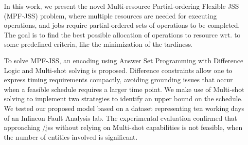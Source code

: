 \documentclass[submission,copyright,creativecommons]{eptcs}
\begin{document}
In this work, we present the novel Multi-resource Partial-ordering Flexible JSS (MPF-JSS) problem, where multiple resources are needed for executing operations, and jobs require partial-ordered sets of operations to be completed. %
The goal is to find the best possible allocation of operations to resource wrt. to some predefined criteria, like the minimization of the tardiness. 

To solve MPF-JSS, an encoding using Answer Set Programming with Difference Logic \cite{gebser2016theory} and Multi-shot solving \cite{gebser2019multi} is proposed. Difference constraints allow one to express timing requirements compactly, avoiding grounding issues that occur when a feasible schedule requires a larger time point. We make use of Multi-shot solving \cite{gebser2019multi} to implement two strategies to identify an upper bound on the schedule.
We tested our proposed model based on a dataset representing ten working days of an Infineon Fault Analysis lab. The experimental evaluation confirmed that approaching /jss without relying on Multi-shot capabilities is not feasible, when the number of entities involved is significant.  %
\end{document}
